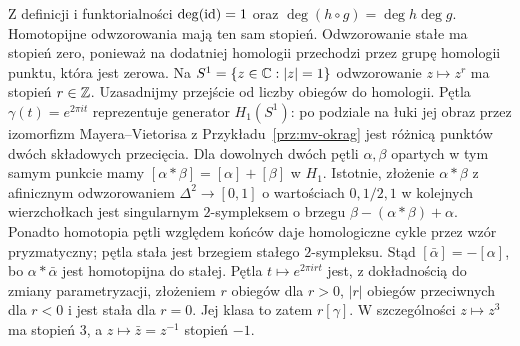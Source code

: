 Z definicji i funktorialności
$\deg(\mathrm{id})=1$ oraz
$\deg(h\circ g)=\deg h\deg g$.
Homotopijne odwzorowania mają ten sam
stopień. Odwzorowanie stałe ma stopień zero, ponieważ
na dodatniej homologii przechodzi przez grupę homologii punktu,
która jest zerowa. Na $S^1=\{z\in\mathbb{C}:|z|=1\}$
odwzorowanie $z\mapsto z^r$ ma stopień $r\in\mathbb{Z}$.
Uzasadnijmy przejście od liczby obiegów do homologii.
Pętla $\gamma(t)=e^{2\pi it}$ reprezentuje generator $H_1(S^1)$:
po podziale na łuki jej obraz przez izomorfizm Mayera--Vietorisa
z Przykładu~\ref{prz:mv-okrag} jest różnicą punktów dwóch składowych przecięcia.
Dla dowolnych dwóch pętli $\alpha,\beta$ opartych w tym samym punkcie
mamy $[\alpha*\beta]=[\alpha]+[\beta]$ w $H_1$.
Istotnie, złożenie $\alpha*\beta$ z afinicznym odwzorowaniem
$\Delta^2\to[0,1]$ o wartościach $0,1/2,1$ w kolejnych wierzchołkach
jest singularnym $2$-sympleksem o brzegu
$\beta-(\alpha*\beta)+\alpha$.
Ponadto homotopia pętli względem końców daje homologiczne cykle
przez wzór pryzmatyczny; pętla stała jest brzegiem stałego $2$-sympleksu.
Stąd $[\bar\alpha]=-[\alpha]$, bo $\alpha*\bar\alpha$ jest
homotopijna do stałej. Pętla $t\mapsto e^{2\pi irt}$ jest,
z dokładnością do zmiany parametryzacji, złożeniem $r$ obiegów dla $r>0$,
$|r|$ obiegów przeciwnych dla $r<0$
i jest stała dla $r=0$. Jej klasa to zatem $r[\gamma]$.
W szczególności $z\mapsto z^3$ ma stopień $3$,
a $z\mapsto\bar z=z^{-1}$ stopień $-1$.

